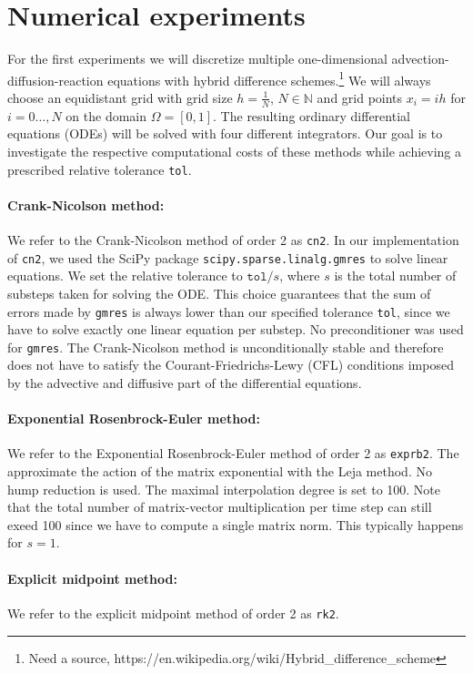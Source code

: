 \documentclass{scrartcl}
\begin{document}
\section{Numerical experiments}\label{sec:NE}
For the first experiments we will discretize multiple one-dimensional advection-diffusion-reaction equations with hybrid difference schemes.\footnote{Need a source, https://en.wikipedia.org/wiki/Hybrid\_difference\_scheme} We will always choose an equidistant grid with grid size $h = \frac{1}{N}$, $N\in\mathbb{N}$ and grid points $x_i = ih$ for $i=0\dots,N$ on the domain $\Omega = [0,1]$. The resulting ordinary differential equations (ODEs) will be solved with four different integrators. Our goal is to investigate the respective computational costs of these methods while achieving a prescribed relative tolerance \texttt{tol}.

\paragraph{Crank-Nicolson method:}
	We refer to the Crank-Nicolson method of order 2 as \texttt{cn2}. 
	In our implementation of \texttt{cn2}, we used the SciPy\cite{scipy} package \texttt{scipy.sparse.linalg.gmres} to solve linear equations. We set the relative tolerance to $\texttt{tol}/s$, where $s$ is the total number of substeps taken for solving the ODE. This choice guarantees that the sum of errors made by \texttt{gmres} is always lower than our specified tolerance \texttt{tol}, since we have to solve exactly one linear equation per substep. No preconditioner was used for \texttt{gmres}. The Crank-Nicolson method is unconditionally stable and therefore does not have to satisfy the Courant-Friedrichs-Lewy (CFL) conditions imposed by the advective and diffusive part of the differential equations.
	
\paragraph{Exponential Rosenbrock-Euler method:}
	We refer to the Exponential Rosenbrock-Euler method of order 2 as \texttt{exprb2}.
	The approximate the action of the matrix exponential with the Leja method. No hump reduction is used. The maximal interpolation degree is set to 100. Note that the total number of matrix-vector multiplication per time step can still exeed 100 since we have to compute a single matrix norm. This typically happens for $s=1$. 

\paragraph{Explicit midpoint method:}
	We refer to the explicit midpoint method of order 2 as \texttt{rk2}. 
\end{document}
